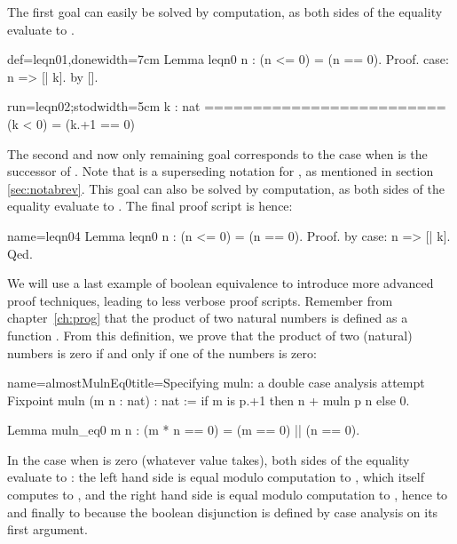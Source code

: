 The first goal
can easily be solved by computation, as both sides of the equality
evaluate to .

\begin{coq-left}{def=leqn01,done}{width=7cm}
Lemma leqn0 n : (n <= 0) = (n == 0).
Proof.
case: n => [| k].
  by [].
\end{coq-left}
\begin{coqout-right}{run=leqn02;stod}{width=5cm}
k : nat
=========================
  (k < 0) = (k.+1 == 0)
$~$
\end{coqout-right}

The second and now only remaining goal corresponds to the case when
 is the successor of . Note that  is a
superseding notation for , as mentioned in section
\ref{sec:notabrev}. This goal can also be  solved by computation, as
both sides of the equality evaluate to .  The final
proof script is hence:

\begin{coq}{name=leqn04}{}
Lemma leqn0 n : (n <= 0) = (n == 0).
Proof.  by case: n => [| k].  Qed.
\end{coq}

We will use a last example of boolean equivalence to introduce more
advanced proof techniques, leading to less verbose proof
scripts. Remember from chapter~\ref{ch:prog} that the product of two
natural numbers is defined as a function
. From this definition, we prove that
the product of two (natural) numbers is zero if and only if one of the
numbers is zero:

\begin{coq}{name=almostMulnEq0}{title=Specifying muln: a double case analysis attempt}
Fixpoint muln (m n : nat) : nat :=
  if m is p.+1 then n + muln p n else 0.

Lemma muln_eq0 m n : (m * n == 0) = (m == 0) || (n == 0).
\end{coq}
In the case when  is zero (whatever value  takes), both
sides of the equality evaluate to : the left hand side is
equal modulo computation to , which itself computes to
, and the right hand side is equal modulo computation to
, hence to  and finally to
 because the boolean disjunction \C{(_ || _)} is defined by
case analysis on its first argument.

